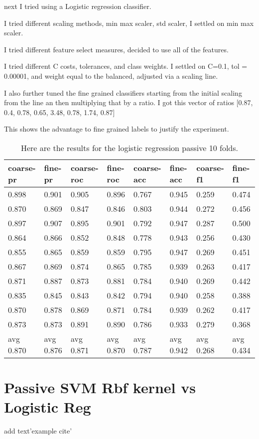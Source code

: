 \documentclass[ms]{nuthesis}
\begin{document}
\par next I tried using a Logistic regression classifier.
\par I tried different scaling methods, min max scaler, std scaler, I settled on min max scaler.
\par I tried different feature select measures, decided to use all of the features.
\par I tried different C costs, tolerances, and class weights. I settled on C=0.1, tol = 0.00001,
and weight equal to the balanced, adjusted via a scaling line.
\par I also further tuned the fine grained classifiers starting from the initial scaling from the
line an then multiplying that by a ratio.
I got this vector of ratios
[0.87, 0.4, 0.78, 0.65, 3.48, 0.78, 1.74, 0.87]
\par This shows the advantage to fine grained labels to justify the experiment.

\FloatBarrier
\begin{table}[h]
  \centering
  \begin{tabular}{|l||l||l||l||l||l||l||l|}\toprule
    coarse-pr & fine-pr & coarse-roc & fine-roc & coarse-acc & fine-acc & coarse-f1 & fine-f1 \\ \midrule
    0.898 & 0.901 & 0.905 & 0.896 & 0.767 & 0.945 & 0.259 & 0.474 \\
    0.870 & 0.869 & 0.847 & 0.846 & 0.803 & 0.944 & 0.272 & 0.456 \\
    0.897 & 0.907 & 0.895 & 0.901 & 0.792 & 0.947 & 0.287 & 0.500 \\
    0.864 & 0.866 & 0.852 & 0.848 & 0.778 & 0.943 & 0.256 & 0.430 \\
    0.855 & 0.865 & 0.859 & 0.859 & 0.795 & 0.947 & 0.269 & 0.451 \\
    0.867 & 0.869 & 0.874 & 0.865 & 0.785 & 0.939 & 0.263 & 0.417 \\
    0.871 & 0.887 & 0.873 & 0.881 & 0.784 & 0.940 & 0.269 & 0.442 \\
    0.835 & 0.845 & 0.843 & 0.842 & 0.794 & 0.940 & 0.258 & 0.388 \\
    0.870 & 0.878 & 0.869 & 0.871 & 0.784 & 0.939 & 0.262 & 0.417 \\
    0.873 & 0.873 & 0.891 & 0.890 & 0.786 & 0.933 & 0.279 & 0.368 \\
    avg 0.870 & avg 0.876 & avg 0.871 & avg 0.870 & avg 0.787 & avg 0.942 & avg 0.268 & avg 0.434 \\ \bottomrule
  \end{tabular}
  \caption{Here are the results for the logistic regression passive 10 folds.}
  \label{tab:logReg}
\end{table}
\FloatBarrier

\section{Passive SVM Rbf kernel vs Logistic Reg}
add text'example cite'\cite{Merialdo2001}
\end{document}
